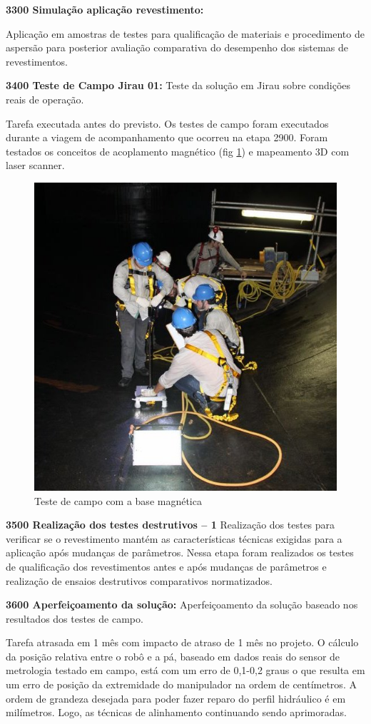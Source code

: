 \noindent
\textbf{3300 Simulação aplicação revestimento:}

Aplicação em amostras de testes para qualificação de materiais e procedimento de aspersão para posterior avaliação comparativa do desempenho dos sistemas de revestimentos.


\noindent
\textbf{3400 Teste de Campo Jirau 01:} Teste da solução  em Jirau sobre
condições reais de operação.

Tarefa executada antes do previsto. Os testes de campo foram executados durante
a viagem de acompanhamento que ocorreu na etapa 2900. Foram testados os
conceitos de acoplamento magnético (fig \ref{fig::teste_base}) e mapeamento 3D
com laser scanner.
\begin{figure}
\centering
\includegraphics[width=0.6\columnwidth]{figs/base}
\caption{Teste de campo com a base  magnética}
\label{fig::teste_base}
\end{figure}

\noindent
\textbf{3500 Realização dos testes destrutivos – 1}
Realização dos testes para verificar se o revestimento mantém as 
características técnicas exigidas para a aplicação após mudanças de parâmetros. Nessa etapa foram realizados os testes de qualificação dos revestimentos antes e após mudanças de parâmetros e realização de ensaios destrutivos comparativos normatizados. 

\noindent
\textbf{3600 Aperfeiçoamento da solução:}
Aperfeiçoamento da solução baseado nos resultados dos testes de campo. 

Tarefa atrasada em 1 mês com impacto de atraso de 1 mês no projeto. O cálculo da
posição relativa entre o robô e a pá, baseado em dados reais do sensor de
metrologia testado em campo, está com um erro de 0,1-0,2 graus o que resulta em
um erro de posição da extremidade do manipulador na ordem de centímetros. A
ordem de grandeza desejada para poder fazer reparo do perfil hidráulico é em
milímetros. Logo, as técnicas de alinhamento continuando sendo aprimoradas.

